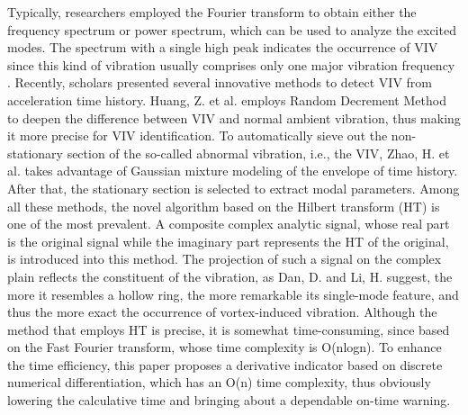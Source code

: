 \documentclass[preprint, 3p, times, compress, 11pt]{elsarticle}
\begin{document}
Typically, researchers employed the Fourier transform to obtain either 
the frequency spectrum or power spectrum, which can be used to analyze 
the excited modes. The spectrum with a single high peak indicates the 
occurrence of VIV since this kind of vibration usually comprises only 
one major vibration frequency \cite{li2018datadriven}. 
Recently, scholars presented several innovative methods to detect VIV 
from acceleration time history. Huang, Z. et al. \cite{huang2019automatic} 
employs Random Decrement Method to deepen the difference between VIV 
and normal ambient vibration, thus making it more precise for VIV 
identification. To automatically sieve out the non-stationary section of 
the so-called abnormal vibration, i.e., the VIV, Zhao, H. et al. 
\cite{zhao2022statemonitoring} takes advantage of Gaussian mixture 
modeling of the envelope of time history. After that, the stationary 
section is selected to extract modal parameters. Among all these methods, 
the novel algorithm based on the Hilbert transform (HT) 
is one of the most prevalent. A composite complex analytic signal, whose 
real part is the original signal while the imaginary part represents the 
HT of the original, is introduced into this method. The projection of 
such a signal on the complex plain reflects the constituent of the 
vibration, as Dan, D. and Li, H. \cite{dan2022monitoring} suggest, the 
more it resembles a hollow ring, the more remarkable its single-mode feature, 
and thus the more exact the occurrence of vortex-induced vibration. 
Although the method that employs HT is precise, it is somewhat 
time-consuming, since based on the Fast Fourier transform, whose time 
complexity is O(nlogn). To enhance the time efficiency, this paper 
proposes a derivative indicator based on discrete numerical 
differentiation, which has an O(n) time complexity, thus obviously 
lowering the calculative time and bringing about a dependable on-time warning. 
\end{document}
